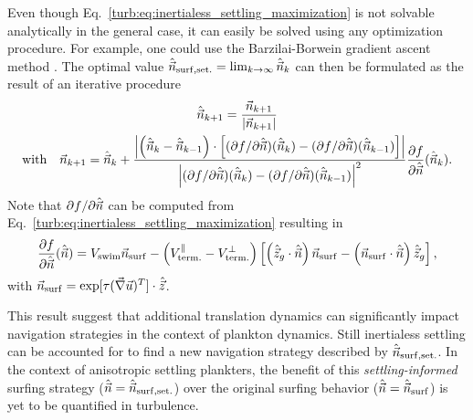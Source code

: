 Even though Eq.~\eqref{turb:eq:inertialess_settling_maximization} is not solvable analytically in the general case, it can easily be solved using any optimization procedure.
For example, one could use the Barzilai-Borwein gradient ascent method \citep{barzilai1988two, fletcher2005barzilai}. 
The optimal value $\ControlDirection_{\mathrm{\NameSurfShort, set.}} = \lim_{k\to\infty} \ControlDirection_k$ can then be formulated as the result of an iterative procedure
\begin{multline}
	 \ControlDirection_{k+1} = \frac{\ControlDirectionNN_{k+1}}{\norm*{\ControlDirectionNN_{k+1}}}\\ 
	 \text{with} \quad \ControlDirectionNN_{k+1} = \ControlDirection_k + \frac{\norm*{ \left(\ControlDirection_k - \ControlDirection_{k-1} \right) \cdot \left[ (\partial f / \partial \ControlDirection) (\ControlDirection_k)  - (\partial f / \partial \ControlDirection) (\ControlDirection_{k-1}) \right] } }{\norm*{(\partial f / \partial \ControlDirection) (\ControlDirection_k)  - (\partial f / \partial \ControlDirection) (\ControlDirection_{k-1})}^2} \frac{\partial f}{\partial \ControlDirection} (\ControlDirection_k).
\end{multline}
Note that $\partial f / \partial \ControlDirection$ can be computed from Eq.~\eqref{turb:eq:inertialess_settling_maximization} resulting in
\begin{equation}
	\frac{\partial f}{\partial \ControlDirection}(\ControlDirection) = \SwimmingVelocity \ControlDirectionOptNN - \left( \TerminalVelocityParallel - \TerminalVelocityOrthogonal \right) \left[ \left( \DirectionSettling \cdot \ControlDirection \right) \ControlDirectionOptNN - \left( \ControlDirectionOptNN \cdot \ControlDirection \right) \DirectionSettling \right],
\end{equation}
with $\ControlDirectionOptNN = \exp [ \TimeHorizon ( \Gradients )^T ] \cdot \Direction$.

This result suggest that additional translation dynamics can significantly impact navigation strategies in the context of plankton dynamics.
Still inertialess settling can be accounted for to find a new navigation strategy described by $\ControlDirection_{\mathrm{\NameSurfShort, set.}}$.
In the context of anisotropic settling plankters, the benefit of this \textit{settling-informed} surfing strategy ($\ControlDirection = \ControlDirection_{\mathrm{\NameSurfShort, set.}}$) over the original surfing behavior ($\ControlDirection = \ControlDirectionOpt$) is yet to be quantified in turbulence.

